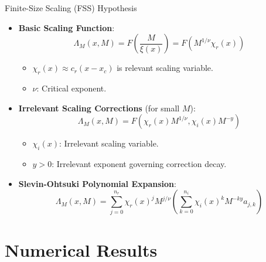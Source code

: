 \documentclass[10pt,aspectratio=169]{beamer}
\begin{document}
\begin{frame}{Finite-Size Scaling (FSS) Hypothesis}
  \begin{itemize}
    \item \textbf{Basic Scaling Function}:
      \begin{equation}
      \Lambda_M(x, M) = F\left( \frac{M}{\xi(x)} \right) = F\left( M^{1/\nu} \chi_r(x) \right)
      \end{equation}
      \begin{itemize}
        \item $\chi_r(x) \approx c_r (x - x_c)$ is relevant scaling variable.
        \item $\nu$: Critical exponent.
      \end{itemize}
    \vspace{0.1cm}
    \item \textbf{Irrelevant Scaling Corrections} (for small $M$):
      \begin{equation}
      \Lambda_M(x, M) = F\left( \chi_r(x) M^{1/\nu}, \chi_i(x) M^{-y} \right)
      \end{equation}
      \begin{itemize}
        \item $\chi_i(x)$: Irrelevant scaling variable.
        \item $y > 0$: Irrelevant exponent governing correction decay.
      \end{itemize}
    \vspace{0.1cm}
    \item \textbf{Slevin-Ohtsuki Polynomial Expansion}:
      \begin{equation}
      \Lambda_M(x, M) = \sum_{j=0}^{n_r} \chi_r(x)^j M^{j/\nu} \left( \sum_{k=0}^{n_i} \chi_i(x)^k M^{-k y} a_{j,k} \right)
      \end{equation}
  \end{itemize}
\end{frame}

\section{Numerical Results}
\end{document}
